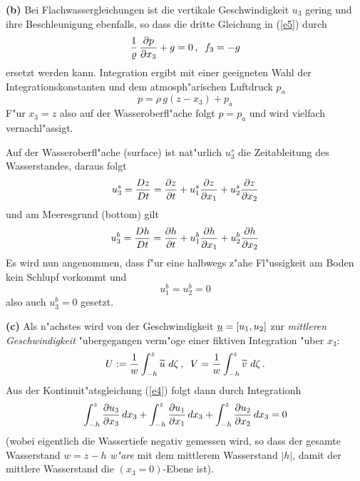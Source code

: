 \documentclass[12pt,a4paper,leqno,twoside]{book}
\begin{document}
{\bf (b)} Bei Flachwassergleichungen ist die vertikale Geschwindigkeit $u_3$ 
gering und ihre Beschleunigung ebenfalls, so dass die dritte Gleichung in 
(\ref{e5}) durch
%
\begin{equation}\label{e6}
\frac{1}{\varrho}\,\frac{\partial p}{\partial x_3} + g = 0\,,\;\; f_3 = - g
\end{equation}
%
ersetzt werden kann. Integration ergibt mit einer geeigneten Wahl der
Integrationskonstanten und dem atmosph"arischen Luftdruck $p_a$
\[
p = \rho\, g(z - x_3) + p_a
\]
F"ur $x_3 = z$ also auf der Wasseroberfl"ache folgt $p = p_a$ und
wird vielfach vernachl"assigt.
\par
Auf der Wasseroberfl"ache (surface) ist nat"urlich $u^s_3$ die Zeitableitung des
Wasserstandes, daraus folgt
%
\begin{equation}\label{e7}
u^s_3 = \frac{Dz}{D t} = \frac{\partial z}{\partial t}
+ u^s_1\frac{\partial z}{\partial x_1} + u^s_2\frac{\partial z}{\partial x_2}
\end{equation}
und am Meeresgrund (bottom) gilt
%
\begin{equation}\label{e8}
u^b_3 = \frac{D h}{D t} = \frac{\partial h}{\partial t}
+ u^b_1\frac{\partial h}{\partial x_1} + u^b_2\frac{\partial h}{\partial x_2}
\end{equation}
%
Es wird nun angenommen, dass f"ur eine halbwegs z"ahe Fl"ussigkeit
am Boden kein Schlupf vorkommt und 
%
\begin{equation}\label{e9}
u^b_1 = u^b_2 = 0
\end{equation}
%
also auch $u^b_3 = 0$ gesetzt.
\par \vspace{0.5ex}
{\bf (c)} Als n"achstes wird von der Geschwindigkeit $\underline{u} = [u_1,u_2]$ zur {\em 
mittleren Geschwindigkeit} "ubergegangen verm"oge einer fiktiven Integration 
"uber $x_3$:
%
\begin{equation}\label{e10}
U := \frac{1}{w}\int_{-h}^z \widetilde{u}\ d\zeta\,,\;\; 
V = \frac{1}{w}\int_{-h}^z \widetilde{v}\ d\zeta\,.
\end{equation}
Aus der Kontinuit"atsgleichung (\ref{e4}) folgt dann durch Integrationh%
%
\begin{equation}\label{e11}
\int_{-h}^z\frac{\partial u_3}{\partial x_3}\,dx_3 +
\int_{-h}^z\frac{\partial u_1}{\partial x_1}\,dx_3 +
\int_{-h}^z\frac{\partial u_2}{\partial x_2}\,dx_3 = 0
\end{equation}
%
(wobei eigentlich die Wassertiefe negativ gemessen wird, so dass der gesamte 
Wasserstand $w = z - h$ {\em w"are} mit dem mittlerem Wasserstand $|h|$,
damit der mittlere Wasserstand die $(x_3 = 0)$-Ebene ist). 
\end{document}
